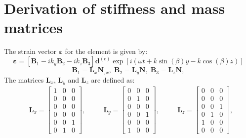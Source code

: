 \documentclass[preprint,12pt]{elsarticle}
\newcommand{\matr}[1]{\mathbf{#1}} %
\newcommand{\vect}[1]{\mathbf{#1}} %
\newcommand{\bs}[1]{\boldsymbol{#1}}
\begin{document}
	 \section{Derivation of stiffness and mass matrices}
	 The strain vector $\bs{\varepsilon}$ for the element is given by:
	  \begin{equation}
	 \bs{\varepsilon}= \left[ \matr{B}_1 -i k_y \matr{B}_2 -i k_z \matr{B}_3 \right] \vect{d}^{(e)} \exp \left[ i (\omega t + k \sin (\beta) y - k \cos (\beta) z)\right]
	 \end{equation}
	  \begin{equation}
	 \matr{B}_1= \matr{L}_x \matr{N}_{,x},\; \matr{B}_2= \matr{L}_y \matr{N},\; \matr{B}_3= \matr{L}_z \matr{N},
	 \end{equation}
	 The matrices $ \matr{L}_x $,  $ \matr{L}_y $ and  $ \matr{L}_z $ are defined as:
	 \begin{equation}
	 \begin{split}
		 & \matr{L}_x = \left[\begin{array}{ccc} 
		 1 & 0 & 0  \\[4pt]
		 0&0&0\\[4pt]
		 0 &0&0  \\[4pt]
		 0&0&0\\[4pt]
		 0&0&1\\[4pt]
		  0&1&0 
		 \end{array} \right], 
	 \end{split} \quad 
	  \begin{split}
		  & \matr{L}_y = \left[\begin{array}{ccc} 
		 0&0&0\\[4pt]
		 0&1&0\\[4pt]
		 0 &0&0\\[4pt]
		 0&0&1\\[4pt]
		 0&0&0\\[4pt]
		 1&0&0 
		 \end{array} \right],
	 \end{split} \quad 
	 \begin{split}
	& \matr{L}_z = \left[\begin{array}{ccc} 
	0&0&0\\[4pt]
	0&0&0\\[4pt]
	0 &0&1\\[4pt]
	0&1&0\\[4pt]
	1&0&0\\[4pt]
	0&0&0 
	\end{array} \right],
	\end{split}
	 \label{eq:selectors}
	 \end{equation} 
\end{document}

